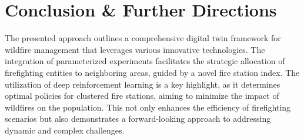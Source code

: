 \documentclass[lettersize,journal]{IEEEtran}
\begin{document}











\section{Conclusion \& Further Directions}

The presented approach outlines a comprehensive digital twin framework for wildfire management that leverages various innovative technologies. The integration of parameterized experiments facilitates the strategic allocation of firefighting entities to neighboring areas, guided by a novel fire station index. The utilization of deep reinforcement learning is a key highlight, as it determines optimal policies for clustered fire stations, aiming to minimize the impact of wildfires on the population. This not only enhances the efficiency of firefighting scenarios but also demonstrates a forward-looking approach to addressing dynamic and complex challenges.
\end{document}
